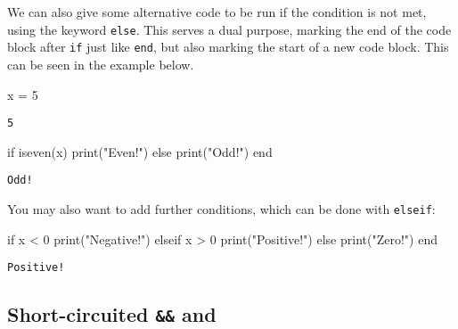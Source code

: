 \documentclass[
  letterpaper,
  DIV=11,
  numbers=noendperiod]{scrreprt}
\newenvironment{Shaded}{\begin{snugshade}}{\end{snugshade}}
\newcommand{\ControlFlowTok}[1]{\textcolor[rgb]{0.00,0.23,0.31}{#1}}
\newcommand{\FloatTok}[1]{\textcolor[rgb]{0.68,0.00,0.00}{#1}}
\newcommand{\FunctionTok}[1]{\textcolor[rgb]{0.28,0.35,0.67}{#1}}
\newcommand{\NormalTok}[1]{\textcolor[rgb]{0.00,0.23,0.31}{#1}}
\newcommand{\OperatorTok}[1]{\textcolor[rgb]{0.37,0.37,0.37}{#1}}
\newcommand{\StringTok}[1]{\textcolor[rgb]{0.13,0.47,0.30}{#1}}
\begin{document}
We can also give some alternative code to be run if the condition is not
met, using the keyword \texttt{else}. This serves a dual purpose,
marking the end of the code block after \texttt{if} just like
\texttt{end}, but also marking the start of a new code block. This can
be seen in the example below.

\begin{Shaded}
\begin{Highlighting}[]
\NormalTok{x }\OperatorTok{=} \FloatTok{5}
\end{Highlighting}
\end{Shaded}

\begin{verbatim}
5
\end{verbatim}

\begin{Shaded}
\begin{Highlighting}[]
\ControlFlowTok{if} \FunctionTok{iseven}\NormalTok{(x)}
    \FunctionTok{print}\NormalTok{(}\StringTok{"Even!"}\NormalTok{)}
\ControlFlowTok{else}
    \FunctionTok{print}\NormalTok{(}\StringTok{"Odd!"}\NormalTok{)}
\ControlFlowTok{end}
\end{Highlighting}
\end{Shaded}

\begin{verbatim}
Odd!
\end{verbatim}

You may also want to add further conditions, which can be done with
\texttt{elseif}:

\begin{Shaded}
\begin{Highlighting}[]
\ControlFlowTok{if}\NormalTok{ x }\OperatorTok{\textless{}} \FloatTok{0}
    \FunctionTok{print}\NormalTok{(}\StringTok{"Negative!"}\NormalTok{)}
\ControlFlowTok{elseif}\NormalTok{ x }\OperatorTok{\textgreater{}} \FloatTok{0}
    \FunctionTok{print}\NormalTok{(}\StringTok{"Positive!"}\NormalTok{)}
\ControlFlowTok{else}
    \FunctionTok{print}\NormalTok{(}\StringTok{"Zero!"}\NormalTok{)}
\ControlFlowTok{end}
\end{Highlighting}
\end{Shaded}

\begin{verbatim}
Positive!
\end{verbatim}

\hypertarget{short-circuited-and}{%
\subsection{\texorpdfstring{Short-circuited \texttt{\&\&} and
\texttt{\textbar{}\textbar{}}}{Short-circuited \&\& and \textbar\textbar{}}}\label{short-circuited-and}}
\end{document}
